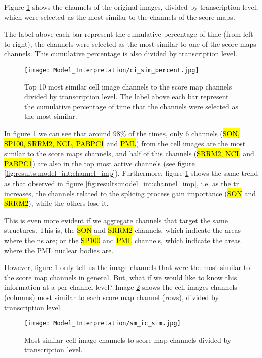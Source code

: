 Figure \ref{fig:results:sm_ci_sim:most} shows the channels of the original images, divided by transcription level, which were selected as the most similar to the channels of the score maps.

The label above each bar represent the cumulative percentage of time (from left to right), the channels were selected as the most similar to one of the score maps channels. This cumulative percentage is also divided by transcription level.

\begin{figure}[htb]
  \centering
  \texttt{[image: Model\_Interpretation/ci\_sim\_percent.jpg]}
  \caption{Top 10 most similar cell image channels to the score map channels divided by transcription level. The label above each bar represent the cumulative percentage of time that the channels were selected as the most similar.}
  \label{fig:results:sm_ci_sim:most}
\end{figure}

In figure \ref{fig:results:sm_ci_sim:most} we can see that around $98\%$ of the times, only 6 channels (\hl{SON, SP100, SRRM2, NCL, PABPC1} and \hl{PML}) from the cell images are the most similar to the score maps channels, and half of this channels (\hl{SRRM2, NCL} and \hl{PABPC1}) are also in the top most active channels (see figure \ref{fig:results:model_int:channel_imp}).
Furthermore, figure \ref{fig:results:sm_ci_sim:most} shows the same trend as that observed in figure \ref{fig:results:model_int:channel_imp}, i.e. as the \gls{tr} increases, the channels related to the splicing process gain importance (\hl{SON} and \hl{SRRM2}), while the others lose it.

This is even more evident if we aggregate channels that target the same structures. This is, the \hl{SON} and \hl{SRRM2} channels, which indicate the areas where the \gls{ns} are; or the \hl{SP100} and \hl{PML} channels, which indicate the areas where the PML nuclear bodies are.

However, figure \ref{fig:results:sm_ci_sim:most} only tell us the image channels that were the most similar to the score map channels in general. But, what if we would like to know this information at a per-channel level?
Image \ref{fig:results:sm_ci_sim:top} shows the cell images channels (columns) most similar to each score map channel (rows), divided by transcription level.

\begin{figure}[htb]
  \centering
  \texttt{[image: Model\_Interpretation/sm\_ic\_sim.jpg]}
  \caption{Most similar cell image channels to score map channels divided by transcription level.}
  \label{fig:results:sm_ci_sim:top}
\end{figure}


